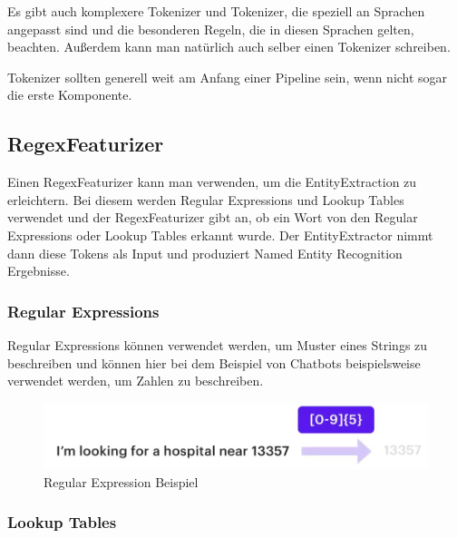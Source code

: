 Es gibt auch komplexere Tokenizer und Tokenizer, die speziell an Sprachen angepasst sind und die besonderen Regeln, die in diesen Sprachen gelten, beachten.
Außerdem kann man natürlich auch selber einen Tokenizer schreiben.\cite{whitespaceTokenizer, rasaMasterclassWhitespaceTokenizer, pipelineComponentsYoutube}

Tokenizer sollten generell weit am Anfang einer Pipeline sein, wenn nicht sogar die erste Komponente.

\subsection{RegexFeaturizer}

Einen RegexFeaturizer kann man verwenden, um die EntityExtraction zu erleichtern.
Bei diesem werden Regular Expressions und Lookup Tables verwendet und der RegexFeaturizer gibt an, ob ein Wort von den Regular Expressions oder Lookup Tables erkannt wurde.
Der EntityExtractor nimmt dann diese Tokens als Input und produziert Named Entity Recognition Ergebnisse.\cite{rasaMasterclassRegexFeaturizer, pipelineComponentsYoutube, regexFeaturizerCrf}

\subsubsection{Regular Expressions}

Regular Expressions können verwendet werden, um Muster eines Strings zu beschreiben und können hier bei dem Beispiel von Chatbots beispielsweise verwendet werden, um Zahlen zu beschreiben.\cite{rasaMasterclassRegexFeaturizer, pipelineComponentsYoutube, regexFeaturizerCrf}

\begin{figure}[hbt!]
    \centering
    \includegraphics[scale=0.5]{pics/regular-expression-example}
    \caption{Regular Expression Beispiel~\cite{pipelineComponentsYoutube}}
    \label{fig:Regular Expression Beispiel}
\end{figure}

\subsubsection{Lookup Tables}

